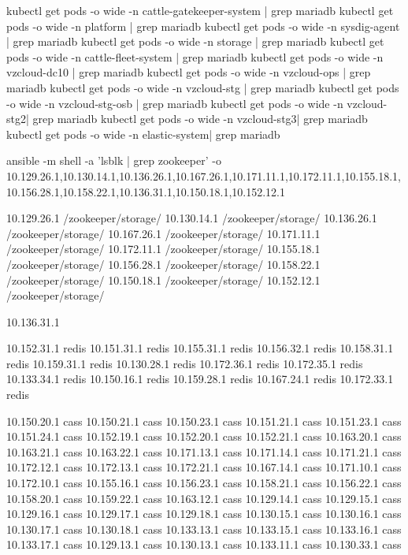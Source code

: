 kubectl get pods -o wide -n cattle-gatekeeper-system | grep mariadb
kubectl get pods -o wide -n platform | grep mariadb
kubectl get pods -o wide -n sysdig-agent | grep mariadb
kubectl get pods -o wide -n storage | grep mariadb
kubectl get pods -o wide -n cattle-fleet-system | grep mariadb
kubectl get pods -o wide -n vzcloud-dc10 | grep mariadb
kubectl get pods -o wide -n vzcloud-ops | grep mariadb
kubectl get pods -o wide -n vzcloud-stg | grep mariadb
kubectl get pods -o wide -n vzcloud-stg-osb | grep mariadb
kubectl get pods -o wide -n vzcloud-stg2| grep mariadb
kubectl get pods -o wide -n vzcloud-stg3| grep mariadb
kubectl get pods -o wide -n elastic-system| grep mariadb


ansible -m shell -a 'lsblk | grep zookeeper' -o 10.129.26.1,10.130.14.1,10.136.26.1,10.167.26.1,10.171.11.1,10.172.11.1,10.155.18.1,10.156.28.1,10.158.22.1,10.136.31.1,10.150.18.1,10.152.12.1


10.129.26.1    /zookeeper/storage/
10.130.14.1    /zookeeper/storage/
10.136.26.1    /zookeeper/storage/
10.167.26.1    /zookeeper/storage/
10.171.11.1    /zookeeper/storage/
10.172.11.1    /zookeeper/storage/
10.155.18.1    /zookeeper/storage/
10.156.28.1    /zookeeper/storage/
10.158.22.1    /zookeeper/storage/
10.150.18.1    /zookeeper/storage/
10.152.12.1    /zookeeper/storage/

10.136.31.1



10.152.31.1   redis
10.151.31.1   redis
10.155.31.1   redis
10.156.32.1   redis
10.158.31.1   redis
10.159.31.1   redis
10.130.28.1   redis
10.172.36.1   redis
10.172.35.1   redis
10.133.34.1   redis
10.150.16.1   redis
10.159.28.1   redis
10.167.24.1   redis
10.172.33.1   redis

10.150.20.1    cass
10.150.21.1    cass
10.150.23.1    cass
10.151.21.1    cass
10.151.23.1    cass
10.151.24.1    cass
10.152.19.1    cass
10.152.20.1    cass
10.152.21.1    cass
10.163.20.1    cass
10.163.21.1    cass
10.163.22.1    cass
10.171.13.1    cass
10.171.14.1    cass
10.171.21.1    cass
10.172.12.1    cass
10.172.13.1    cass
10.172.21.1    cass
10.167.14.1    cass
10.171.10.1    cass
10.172.10.1    cass
10.155.16.1    cass
10.156.23.1    cass
10.158.21.1    cass
10.156.22.1    cass
10.158.20.1    cass
10.159.22.1    cass
10.163.12.1    cass
10.129.14.1    cass
10.129.15.1    cass
10.129.16.1    cass
10.129.17.1    cass
10.129.18.1    cass
10.130.15.1    cass
10.130.16.1    cass
10.130.17.1    cass
10.130.18.1    cass
10.133.13.1    cass
10.133.15.1    cass
10.133.16.1    cass
10.133.17.1    cass
10.129.13.1    cass
10.130.13.1    cass
10.133.11.1    cass
10.130.33.1    cass

